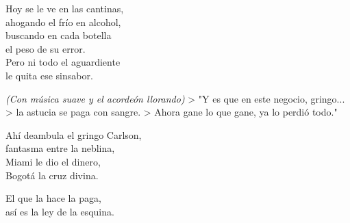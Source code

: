 \begin{lyrics}
Hoy se le ve en las cantinas,\\
ahogando el frío en alcohol,\\
buscando en cada botella\\
el peso de su error.\\
Pero ni todo el aguardiente\\
le quita ese sinsabor.

\emph{(Con música suave y el acordeón llorando)}
> "Y es que en este negocio, gringo...
> la astucia se paga con sangre.
> Ahora gane lo que gane, ya lo perdió todo."

Ahí deambula el gringo Carlson,\\
fantasma entre la neblina,\\
Miami le dio el dinero,\\
Bogotá la cruz divina.

El que la hace la paga,\\
así es la ley de la esquina.

\end{lyrics}

